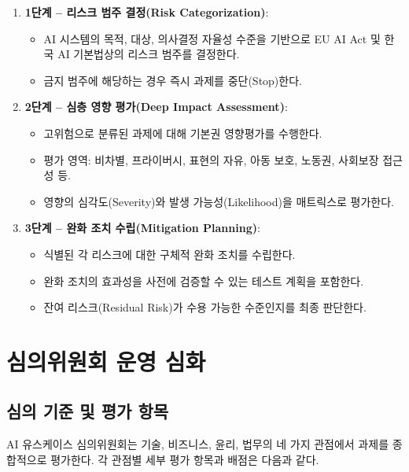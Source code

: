 \begin{enumerate}
    \item \textbf{1단계 -- 리스크 범주 결정(Risk Categorization)}:
    \begin{itemize}
        \item AI 시스템의 목적, 대상, 의사결정 자율성 수준을 기반으로 EU AI Act 및 한국 AI 기본법상의 리스크 범주를 결정한다.
        \item 금지 범주에 해당하는 경우 즉시 과제를 중단(Stop)한다.
    \end{itemize}
    \item \textbf{2단계 -- 심층 영향 평가(Deep Impact Assessment)}:
    \begin{itemize}
        \item 고위험으로 분류된 과제에 대해 기본권 영향평가를 수행한다.
        \item 평가 영역: 비차별, 프라이버시, 표현의 자유, 아동 보호, 노동권, 사회보장 접근성 등.
        \item 영향의 심각도(Severity)와 발생 가능성(Likelihood)을 매트릭스로 평가한다.
    \end{itemize}
    \item \textbf{3단계 -- 완화 조치 수립(Mitigation Planning)}:
    \begin{itemize}
        \item 식별된 각 리스크에 대한 구체적 완화 조치를 수립한다.
        \item 완화 조치의 효과성을 사전에 검증할 수 있는 테스트 계획을 포함한다.
        \item 잔여 리스크(Residual Risk)가 수용 가능한 수준인지를 최종 판단한다.
    \end{itemize}
\end{enumerate}

\section{심의위원회 운영 심화}
\label{sec:8.4}

\subsection{심의 기준 및 평가 항목}
\label{sec:8.4.1}

AI 유스케이스 심의위원회는 기술, 비즈니스, 윤리, 법무의 네 가지 관점에서 과제를 종합적으로 평가한다. 각 관점별 세부 평가 항목과 배점은 다음과 같다.

